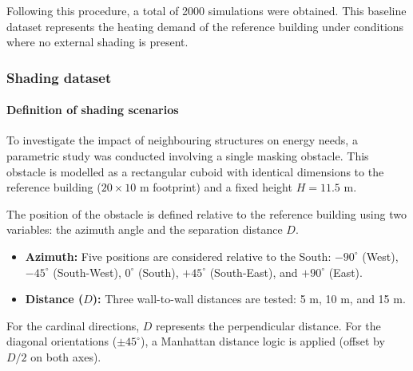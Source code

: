 \documentclass{article}
\begin{document}
Following this procedure, a total of 2000 simulations were obtained. This baseline dataset represents the heating demand of the reference building under conditions where no external shading is present.


\subsubsection{Shading dataset}

\paragraph{Definition of shading scenarios}
To investigate the impact of neighbouring structures on energy needs, a parametric study was conducted involving a single masking obstacle. This obstacle is modelled as a rectangular cuboid with identical dimensions to the reference building ($20 \times 10$ m footprint) and a fixed height $H = 11.5$ m.

The position of the obstacle is defined relative to the reference building using two variables: the azimuth angle and the separation distance $D$.
\begin{itemize}
    \item \textbf{Azimuth:} Five positions are considered relative to the South: $-90^\circ$ (West), $-45^\circ$ (South-West), $0^\circ$ (South), $+45^\circ$ (South-East), and $+90^\circ$ (East).
    \item \textbf{Distance ($D$):} Three wall-to-wall distances are tested: 5 m, 10 m, and 15 m.
\end{itemize}

For the cardinal directions, $D$ represents the perpendicular distance. For the diagonal orientations ($\pm 45^\circ$), a Manhattan distance logic is applied (offset by $D/2$ on both axes).
\end{document}
